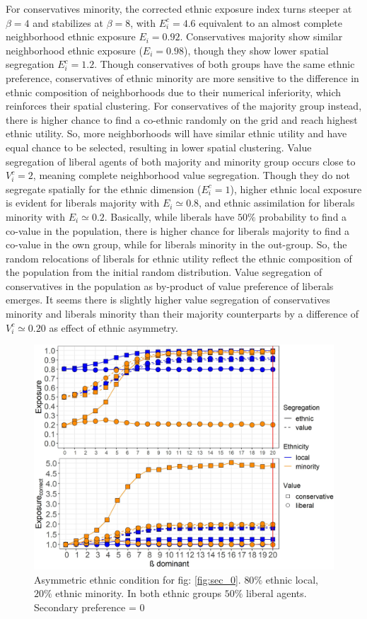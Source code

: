 \documentclass{article}
\begin{document}
For conservatives minority, the corrected ethnic exposure index turns steeper at $\beta = 4$ and stabilizes at $\beta = 8$, with $E^c_i = 4.6$ equivalent to an almost complete neighborhood ethnic exposure $E_i = 0.92$. Conservatives majority show similar neighborhood ethnic exposure ($E_i = 0.98$), though they show lower spatial segregation $E^c_i = 1.2$. Though conservatives of both groups have the same ethnic preference, conservatives of ethnic minority are more sensitive to the difference in ethnic composition of neighborhoods due to their numerical inferiority, which reinforces their spatial clustering. For conservatives of the majority group instead, there is higher chance to find a co-ethnic randomly on the grid and reach highest ethnic utility. So, more neighborhoods will have similar ethnic utility and have equal chance to be selected, resulting in lower spatial clustering. Value segregation of liberal agents of both majority and minority group occurs close to $V^c_i = 2$, meaning complete neighborhood value segregation. Though they do not segregate spatially for the ethnic dimension ($E^c_i = 1$), higher ethnic local exposure is evident for liberals majority with $E_i \simeq 0.8$, and ethnic assimilation for liberals minority with $E_i \simeq 0.2$. Basically, while liberals have $50 \%$ probability to find a co-value in the population, there is higher chance for liberals majority to find a co-value in the own group, while for liberals minority in the out-group. So, the random relocations of liberals for ethnic utility reflect the ethnic composition of the population from the initial random distribution. Value segregation of conservatives in the population as by-product of value preference of liberals emerges. It seems there is slightly higher value segregation of conservatives minority and liberals minority than their majority counterparts by a difference of $V^c_i \simeq 0.20$ as effect of ethnic asymmetry.

\begin{figure}[H]
    \centering
    \includegraphics[scale=0.5]{material/figures/asym_dom.jpg}
    \caption{Asymmetric ethnic condition for fig: \ref{fig:sec_0}. $80 \%$ ethnic local, $20 \%$ ethnic minority. In both ethnic groups $50 \%$ liberal agents. Secondary preference =  0}
    \label{fig:asym}
\end{figure} %
\end{document}
